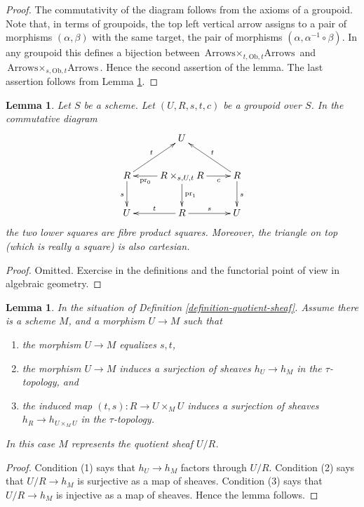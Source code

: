 \documentclass{amsart}
\theoremstyle{plain}
\newtheorem{lemma}[subsection]{Lemma}
\theoremstyle{definition}
\theoremstyle{remark}
\numberwithin{equation}{subsection}
\begin{document}
\begin{proof}
The commutativity of the diagram follows from the axioms of a groupoid.
Note that, in terms of groupoids, the top left vertical arrow assigns to
a pair of morphisms $(\alpha, \beta)$ with the same target, the pair
of morphisms $(\alpha, \alpha^{-1} \circ \beta)$. In any groupoid
this defines a bijection between
$\text{Arrows} \times_{t, \text{Ob}, t} \text{Arrows}$
and
$\text{Arrows} \times_{s, \text{Ob}, t} \text{Arrows}$. Hence the second
assertion of the lemma.
The last assertion follows from Lemma \ref{lemma-diagram}.
\end{proof}


\begin{lemma}
\label{lemma-diagram}
Let $S$ be a scheme.
Let $(U, R, s, t, c)$ be a groupoid over $S$.
In the commutative diagram
$$
\xymatrix{
& U & \\
R \ar[d]_s \ar[ru]^t &
R \times_{s, U, t} R
\ar[l]^-{\text{pr}_0} \ar[d]^{\text{pr}_1} \ar[r]_-c &
R \ar[d]^s \ar[lu]_t \\
U & R \ar[l]_t \ar[r]^s & U
}
$$
the two lower squares are fibre product squares.
Moreover, the triangle on top (which is really a square)
is also cartesian.
\end{lemma}

\begin{proof}
Omitted.
Exercise in the definitions and the functorial point of
view in algebraic geometry.
\end{proof}


\begin{lemma}
\label{lemma-criterion-quotient-representable}
In the situation of Definition \ref{definition-quotient-sheaf}.
Assume there is a scheme $M$, and a morphism $U \to M$ such that
\begin{enumerate}
\item the morphism $U \to M$ equalizes $s, t$,
\item the morphism $U \to M$ induces a surjection of sheaves
$h_U \to h_M$ in the $\tau$-topology, and
\item the induced map $(t, s) : R \to U \times_M U$ induces a
surjection of sheaves $h_R \to h_{U \times_M U}$ in the $\tau$-topology.
\end{enumerate}
In this case $M$ represents the quotient sheaf $U/R$.
\end{lemma}

\begin{proof}
Condition (1) says that $h_U \to h_M$ factors through $U/R$.
Condition (2) says that $U/R \to h_M$ is surjective as a map of sheaves.
Condition (3) says that $U/R \to h_M$ is injective as a map of sheaves.
Hence the lemma follows.
\end{proof}
\end{document}
